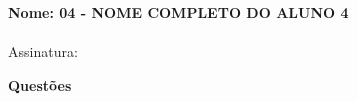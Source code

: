 \documentclass[addpoints,,12pt]{exam}
\begin{document}
	\begin{mdframed}[align=left]
		\textbf{Nome: 04 - NOME COMPLETO DO ALUNO 4}
		\\
		\\Assinatura:
	\end{mdframed}

	\newpage	
	
\noindent \textbf{Questões}

\begin{questions}










\end{questions}
\end{document}
